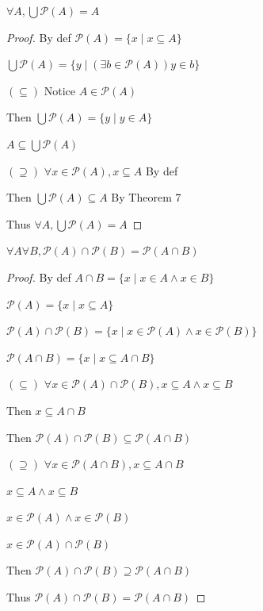\documentclass[12pt, a4paper, oneside]{article}
\begin{document}
    \begin{theorem}
        $\forall A, \bigcup \mathscr{P}(A) = A$
    \end{theorem}
    
    \begin{proof}
        By def $\mathscr{P}(A) = \{x \mid x \subseteq A\}$

        $\bigcup \mathscr{P}(A) = \{y\mid (\exists b \in \mathscr{P}(A))y\in b\}$

        $(\subseteq)$ Notice $A \in \mathscr{P}(A)$

        Then $\bigcup \mathscr{P}(A) = \{y \mid y \in A\}$

        $A \subseteq \bigcup \mathscr{P}(A)$

        $(\supseteq)$ $\forall x \in \mathscr{P}(A), x \subseteq A$ By def

        Then $\bigcup \mathscr{P}(A) \subseteq A$ By Theorem 7

        Thus $\forall A, \bigcup \mathscr{P}(A) = A$
    \end{proof}

    \begin{theorem}
        $\forall A \forall B, \mathscr{P}(A) \cap \mathscr{P}(B) = \mathscr{P}(A \cap B)$
    \end{theorem}

    \begin{proof}
        By def $A \cap B = \{x\mid x\in A \wedge x \in B\}$

        $\mathscr{P}(A) = \{x \mid x \subseteq A\}$

        $\mathscr{P}(A) \cap \mathscr{P}(B) = \{x\mid x\in \mathscr{P}(A) \wedge x \in \mathscr{P}(B) \}$

        $\mathscr{P}(A \cap B) = \{x\mid x \subseteq A \cap B\}$

        $(\subseteq)$ $\forall x \in \mathscr{P}(A) \cap \mathscr{P}(B), x \subseteq A \wedge x \subseteq B$ 

        Then $x\subseteq A \cap B$

        Then $\mathscr{P}(A) \cap \mathscr{P}(B) \subseteq \mathscr{P}(A \cap B)$

        $(\supseteq)$ $\forall x \in \mathscr{P}(A \cap B), x \subseteq A \cap B$

        $x\subseteq A \wedge x \subseteq B$

        $x\in \mathscr{P}(A) \wedge x \in \mathscr{P}(B)$

        $x \in \mathscr{P}(A) \cap \mathscr{P}(B)$

        Then $\mathscr{P}(A) \cap \mathscr{P}(B) \supseteq \mathscr{P}(A \cap B)$

        Thus $\mathscr{P}(A) \cap \mathscr{P}(B) = \mathscr{P}(A \cap B)$
    \end{proof}
\end{document}
